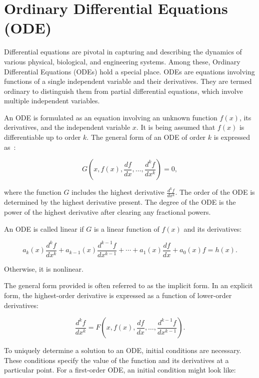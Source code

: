 \documentclass[12pt,a4paper]{report}
\begin{document}
\section{Ordinary Differential Equations (ODE)}
Differential equations are pivotal in capturing and describing the dynamics of various physical, biological, and engineering systems. Among these, Ordinary Differential Equations (ODEs) hold a special place. ODEs are equations involving functions of a single independent variable and their derivatives. They are termed ordinary to distinguish them from partial differential equations, which involve multiple independent variables.

An ODE is formulated as an equation involving an unknown function \( f(x) \), its derivatives, and the independent variable \( x \). It is being assumed that \( f(x) \) is differentiable up to order \( k \). The general form of an ODE of order \( k \) is expressed as~\cite{odes}:

\begin{equation}
  G\left(x, f(x), \frac{df}{dx}, \ldots, \frac{d^k f}{dx^k}\right) = 0,
\end{equation}

where the function \( G \) includes the highest derivative \( \frac{d^k f}{dx^k} \). The order of the ODE is determined by the highest derivative present. The degree of the ODE is the power of the highest derivative after clearing any fractional powers.

An ODE is called linear if \( G \) is a linear function of \( f(x) \) and its derivatives:

\begin{equation}
  a_k(x) \frac{d^k f}{dx^k} + a_{k-1}(x) \frac{d^{k-1} f}{dx^{k-1}} + \cdots + a_1(x) \frac{df}{dx} + a_0(x) f = h(x).
\end{equation}

Otherwise, it is nonlinear.

The general form provided is often referred to as the implicit form. In an explicit form, the highest-order derivative is expressed as a function of lower-order derivatives:

\begin{equation}
  \frac{d^k f}{dx^k} = F\left(x, f(x), \frac{df}{dx}, \ldots, \frac{d^{k-1} f}{dx^{k-1}}\right).
\end{equation}

To uniquely determine a solution to an ODE, initial conditions are necessary. These conditions specify the value of the function and its derivatives at a particular point. For a first-order ODE, an initial condition might look like:
\end{document}
